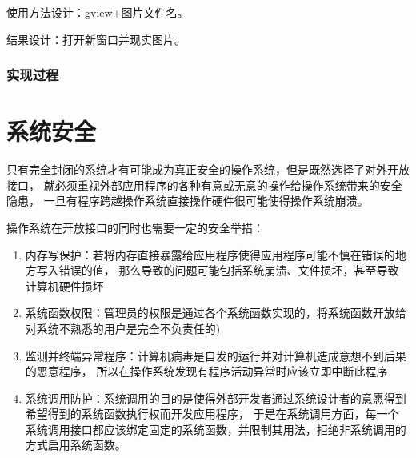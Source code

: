     使用方法设计：gview+图片文件名。

    结果设计：打开新窗口并现实图片。
    \subsubsection{实现过程}

\section{系统安全}

只有完全封闭的系统才有可能成为真正安全的操作系统，但是既然选择了对外开放接口，
就必须重视外部应用程序的各种有意或无意的操作给操作系统带来的安全隐患，
一旦有程序跨越操作系统直接操作硬件很可能使得操作系统崩溃。

操作系统在开放接口的同时也需要一定的安全举措：
\begin{enumerate}
    \item 内存写保护：若将内存直接暴露给应用程序使得应用程序可能不慎在错误的地方写入错误的值，
    那么导致的问题可能包括系统崩溃、文件损坏，甚至导致计算机硬件损坏
    \item 系统函数权限：管理员的权限是通过各个系统函数实现的，将系统函数开放给对系统不熟悉的用户是完全不负责任的)
    \item 监测并终端异常程序：计算机病毒是自发的运行并对计算机造成意想不到后果的恶意程序，
    所以在操作系统发现有程序活动异常时应该立即中断此程序
    \item 系统调用防护：系统调用的目的是使得外部开发者通过系统设计者的意愿得到希望得到的系统函数执行权而开发应用程序，
    于是在系统调用方面，每一个系统调用接口都应该绑定固定的系统函数，并限制其用法，拒绝非系统调用的方式启用系统函数。
\end{enumerate}